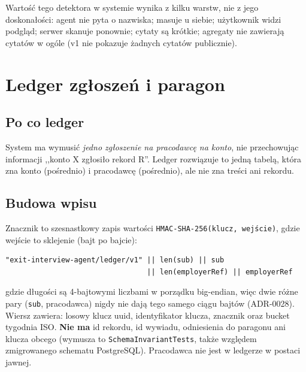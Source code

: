 
Wartość tego detektora w systemie wynika z kilku warstw, nie z jego doskonałości:
agent nie pyta o nazwiska; masuje u siebie; użytkownik widzi podgląd; serwer skanuje
ponownie; cytaty są krótkie; agregaty nie zawierają cytatów w ogóle (v1 nie
pokazuje żadnych cytatów publicznie).

\section{Ledger zgłoszeń i paragon}
\label{sec:p3-ledger}

\subsection{Po co ledger}

System ma wymusić \emph{jedno zgłoszenie na pracodawcę na konto}, nie przechowując
informacji ,,konto X zgłosiło rekord R''. Ledger rozwiązuje to jedną tabelą,
która zna konto (pośrednio) i pracodawcę (pośrednio), ale nie zna treści ani
rekordu.

\subsection{Budowa wpisu}

Znacznik to szesnastkowy zapis wartości
\texttt{HMAC-SHA-256(klucz, wejście)}, gdzie wejście to sklejenie (bajt po bajcie):

\begin{Verbatim}[fontsize=\small]
"exit-interview-agent/ledger/v1" || len(sub) || sub
                                 || len(employerRef) || employerRef
\end{Verbatim}

gdzie długości są 4-bajtowymi liczbami w porządku big-endian, więc dwie różne pary
(\texttt{sub}, pracodawca) nigdy nie dają tego samego ciągu bajtów (ADR-0028).
Wiersz zawiera: losowy klucz uuid, identyfikator klucza, znacznik oraz bucket
tygodnia ISO. \textbf{Nie ma} id rekordu, id wywiadu, odniesienia do paragonu ani
klucza obcego (wymusza to \texttt{SchemaInvariantTests}, także względem
zmigrowanego schematu PostgreSQL). Pracodawca nie jest w ledgerze w postaci
jawnej.

